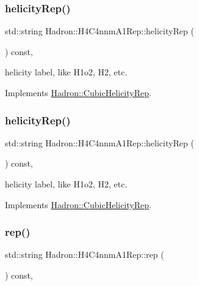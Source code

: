\subsubsection{\texorpdfstring{helicityRep()}{helicityRep()}\hspace{0.1cm}{\footnotesize\ttfamily [2/3]}}
{\footnotesize\ttfamily std\+::string Hadron\+::\+H4\+C4nnm\+A1\+Rep\+::helicity\+Rep (\begin{DoxyParamCaption}{ }\end{DoxyParamCaption}) const\hspace{0.3cm}{\ttfamily [inline]}, {\ttfamily [virtual]}}

helicity label, like H1o2, H2, etc. 

Implements \mbox{\hyperlink{structHadron_1_1CubicHelicityRep_af1096946b7470edf0a55451cc662f231}{Hadron\+::\+Cubic\+Helicity\+Rep}}.

\mbox{\label{structHadron_1_1H4C4nnmA1Rep_a9693ffed8dcfde2846c4cf56c107f88c}} 
\subsubsection{\texorpdfstring{helicityRep()}{helicityRep()}\hspace{0.1cm}{\footnotesize\ttfamily [3/3]}}
{\footnotesize\ttfamily std\+::string Hadron\+::\+H4\+C4nnm\+A1\+Rep\+::helicity\+Rep (\begin{DoxyParamCaption}{ }\end{DoxyParamCaption}) const\hspace{0.3cm}{\ttfamily [inline]}, {\ttfamily [virtual]}}

helicity label, like H1o2, H2, etc. 

Implements \mbox{\hyperlink{structHadron_1_1CubicHelicityRep_af1096946b7470edf0a55451cc662f231}{Hadron\+::\+Cubic\+Helicity\+Rep}}.

\mbox{\label{structHadron_1_1H4C4nnmA1Rep_a1284b0ca578df221e5280750522ab4b2}} 
\subsubsection{\texorpdfstring{rep()}{rep()}\hspace{0.1cm}{\footnotesize\ttfamily [1/5]}}
{\footnotesize\ttfamily std\+::string Hadron\+::\+H4\+C4nnm\+A1\+Rep\+::rep (\begin{DoxyParamCaption}{ }\end{DoxyParamCaption}) const\hspace{0.3cm}{\ttfamily [inline]}, {\ttfamily [virtual]}}



